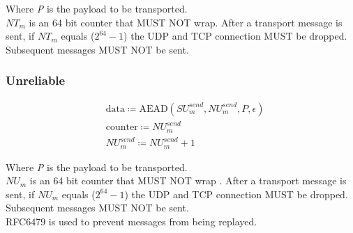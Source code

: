 \documentclass{article}
\begin{document}
    Where \emph{P} is the payload to be transported.\\

    $\mathit{NT}_{m}$ is an 64 bit counter that MUST NOT wrap. After a transport message is sent, if $\mathit{NT}_{m}$ equals
    ($2^{64}-1$) the UDP and TCP connection MUST be dropped. Subsequent messages MUST NOT be sent. \\


    \subsubsection{Unreliable}

    \begin{align*}
        & \text{data} \coloneqq \text{AEAD}(\mathit{SU}_{m}^{send},\mathit{NU}_{m}^{send}, P, \epsilon)\\
        & \text{counter} \coloneqq \mathit{NU}_{m}^{send}\\
        & \mathit{NU}_{m}^{send} \coloneqq \mathit{NU}_{m}^{send} + 1
    \end{align*}


    Where \emph{P} is the payload to be transported.\\

    $\mathit{NU}_{m}$ is an 64 bit counter that MUST NOT wrap .
    After a transport message is sent, if $\mathit{NU}_{m}$ equals
    ($2^{64}-1$) the UDP and TCP connection MUST be dropped.
    Subsequent messages MUST NOT be sent. \\

    RFC6479 is used to prevent messages from being replayed.
\end{document}

